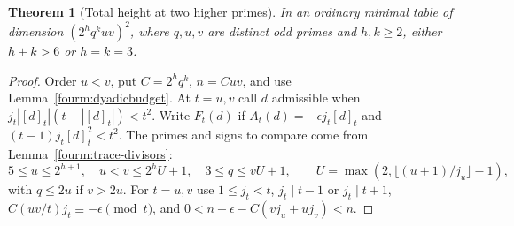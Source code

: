 \documentclass[11pt,a4paper]{article}
\numberwithin{equation}{section}
\newtheorem{theorem}{Theorem}[section]
\theoremstyle{remark}
\begin{document}
\begin{theorem}[Total height at two higher primes]\label{fam:M:8.15}
\label{fourm:even-total}\label{new:evenfull}\label{seq:dyadic-six}\label{seq:dyadic-quartic-sextic}
In an ordinary minimal table of dimension $(2^h q^k uv)^2$, where
$q,u,v$ are distinct odd primes and $h,k\ge2$, either $h+k>6$ or $h=k=3$.
\end{theorem}
\begin{proof}
Order $u<v$, put $C=2^h q^k$, $n=Cuv$, and use
Lemma~\ref{fourm:dyadicbudget}. At $t=u,v$ call $d$ admissible when
$j_t|[d]_t|(t-|[d]_t|)<t^2$. Write $F_t(d)$ if
$A_t(d)=-\epsilon j_t[d]_t$ and $(t-1)j_t[d]_t^2<t^2$.
The primes and signs to compare come from Lemma~\ref{fourm:trace-divisors}:
\[
 5\le u\le2^{h+1},\quad u<v\le2^h U+1,\quad
 3\le q\le vU+1,\qquad U=\max(2,\lfloor(u+1)/j_u\rfloor-1),
\]
with $q\le2u$ if $v>2u$. For $t=u,v$ use $1\le j_t<t$,
$j_t\mid t-1$ or $j_t\mid t+1$, $C(uv/t)j_t\equiv-\epsilon\pmod t$,
and $0<n-\epsilon-C(vj_u+uj_v)<n$.


\end{proof}
\end{document}
